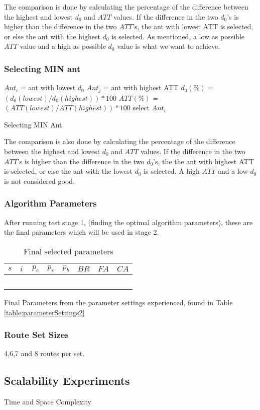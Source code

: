 The comparison is done by calculating the percentage of the difference between the highest and lowest $d_0$ and $ATT$ values. If the difference in the two $d_0$'s is higher than the difference in the two $ATT$'s, the ant with lowest ATT is selected, or else the ant with the highest $d_0$ is selected. As mentioned, a low as possible $ATT$ value and a high as possible $d_0$ value is what we want to achieve.

\subsubsection{Selecting MIN ant}
\begin{algorithm}[H]
$Ant_{i}$ = ant with lowest $d_0$\;
$Ant_{j}$ = ant with highest ATT\;
{
	$d_0(\%)$ = $(d_0(lowest) / d_0(highest))*100$\;
	$ATT(\%)$ = $(ATT(lowest) / ATT(highest))*100$\;
	{
		select $Ant_{i}$
	}
}
 \caption{Selecting MIN Ant}

\end{algorithm}

The comparison is also done by calculating the percentage of the difference between the highest and lowest $d_0$ and $ATT$ values. If the difference in the two $ATT$'s is higher than the difference in the two $d_0$'s, the the ant with highest ATT is selected, or else the ant with the lowest $d_0$ is selected. A high $ATT$ and a low $d_0$ is not considered good. 

\subsubsection{Algorithm Parameters}
After running test stage 1, (finding the optimal algorithm parameters), these are the final parameters which will be used in stage 2.

\begin{table}[H]
	\centering
    \begin{tabular}{|l|l|l|l|l|l|l|l|}
 	\hline
 	$s$ & $i$ & $p_{e}$ & $p_{v}$ & $p_{b}$ & $BR$ & $FA$ & $CA$  \\
 	\hline
    ~ & ~ & ~ & ~ & ~ & ~ & ~ & ~ \\
	\hline
    \end{tabular}
    \caption {Final selected parameters}
    Final Parameters from the parameter settings experienced, found in Table \vref{table:parameterSettings2}
    \label{table:finalParameters}
	\end{table}

\subsubsection{Route Set Sizes}
4,6,7 and 8 routes per set.

\subsection{Scalability Experiments}
Time and Space Complexity
